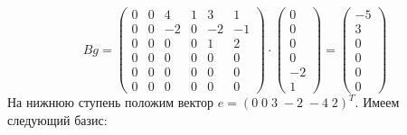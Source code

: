 \[
Bg = 
\begin{pmatrix}
0 & 0 & 4 & 1 & 3 & 1 \\
0 & 0 & -2 & 0 & -2 & -1 \\
0 & 0 & 0 & 0 & 1 & 2 \\
0 & 0 & 0 & 0 & 0 & 0 \\
0 & 0 & 0 & 0 & 0 & 0 \\
0 & 0 & 0 & 0 & 0 & 0
\end{pmatrix}
\cdot
\begin{pmatrix}
0 \\
0 \\
0 \\
0 \\
-2 \\
1
\end{pmatrix}
=
\begin{pmatrix}
-5 \\
3 \\
0 \\
0 \\
0 \\
0 
\end{pmatrix}
\]
\noindent На нижнюю ступень положим вектор \(e = (0 \; 0 \; 3 \; -2 \; -4 \;2)^T\). Имеем следующий базис: \\

